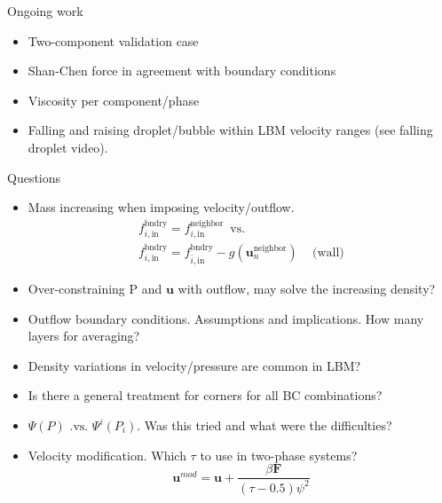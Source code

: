 \documentclass[8pt]{beamer}
\begin{document}
	\begin{frame}{Ongoing work}
		\begin{itemize}
			\item Two-component validation case
			\item Shan-Chen force in agreement with boundary conditions
			\item Viscosity per component/phase
			\item Falling and raising droplet/bubble within LBM velocity ranges (see falling droplet video).
		\end{itemize}
	\end{frame}
	
	\begin{frame}{Questions}
		\begin{itemize}
			\item<1> Mass increasing when imposing velocity/outflow.
			\begin{equation*}
			\begin{split}
				f_{i,\text{in}}^{\text{bndry}} = f_{i,\text{in}}^{\text{neighbor}} \, \, \, \text{vs.}\\
				f_{i,\text{in}}^{\text{bndry}} = f_{\bar{i},\text{in}}^{\text{bndry}} - g(\mathbf{u}_{n}^{\text{neighbor}}) \,\,\,\,\, \text{    (wall)}
			\end{split}
			\end{equation*}
			\item<1> Over-constraining P and $\mathbf{u}$ with outflow, may solve the increasing density?
			\item<2> Outflow boundary conditions. Assumptions and implications. How many layers for averaging?
			\item<2> Density variations in velocity/pressure are common in LBM?
			\item<3> Is there a general treatment for corners for all BC combinations?
			\item<3> $\Psi(P) \text{ .vs. } \Psi^i(P_i)$. Was this tried and what were the difficulties?
			\item<3> Velocity modification. Which $\tau$ to use in two-phase systems?
			\begin{equation}
			\mathbf{u}^{mod} = \mathbf{u} + \frac{\beta \mathbf{F}}{(\tau - 0.5)\psi^2}
			\end{equation}
		\end{itemize}
	\end{frame}
\end{document}
